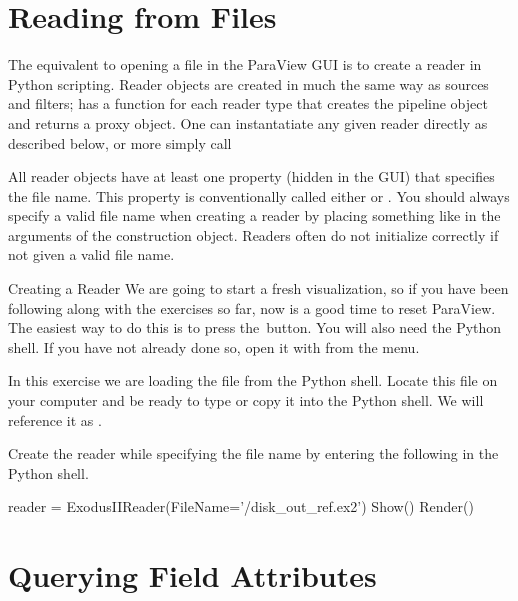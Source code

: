 \section{Reading from Files}
\label{sec:ReadingFromFiles}

The equivalent to opening a file in the ParaView GUI is to create a reader
in Python scripting.  Reader objects are created in much the same way as
sources and filters;  has a function for each
reader type that creates the pipeline object and returns a proxy
object. One can instantatiate any given reader directly as described
below, or more simply call 

All reader objects have at least one property (hidden in the GUI) that
specifies the file name.  This property is conventionally called either
 or .  You should always specify a valid
file name when creating a reader by placing something like
 in the arguments of the construction
object.  Readers often do not initialize correctly if not given a valid
file name.

\begin{exercise}{Creating a Reader}
  \label{ex:CreatingAReader}%
  We are going to start a fresh visualization, so if you have been
  following along with the exercises so far, now is a good time to reset
  ParaView.  The easiest way to do this is to press the~\disconnect button.
  You will also need the Python shell.  If you have not already done so,
  open it with  \ra {} from the menu.

  In this exercise we are loading the  file from
  the Python shell.  Locate this file on your computer and be ready to type
  or copy it into the Python shell.  We will reference it as
  .

  Create the reader while specifying the file name by entering the following
  in the Python shell.

  \begin{pythonpluscommands}
reader = ExodusIIReader(FileName='/disk_out_ref.ex2')
Show()
Render()
  \end{pythonpluscommands}
\end{exercise}


\section{Querying Field Attributes}
\label{sec:QueryingFieldAttributes}

